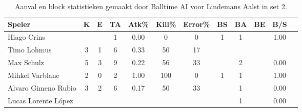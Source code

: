 \begin{table}[ht!]
  \centering
  \scriptsize
  \begin{tabular}{|l|c|c|c|c|c|c|c|c|c|c|c|} \hline
    \textbf{Speler} & K & E & TA & Atk\% & Kill\%  & Error\% & BS & BA & BE & B/S \\ \hline
    Hiago Crins & & & 1 & 0.00 & 0  & 0 & 1 & 1 & & 1.00 \\
    Timo Lohmus & 3 & 1 & 6 & 0.33 & 50  & 17 &  &  & & \\
    Max Schulz & 5 & 3 & 9 & 0.22 & 56  & 33 &  & 2 & & 0.00 \\
    Mihkel Varblane & 2 & 0 & 2 & 1.00 & 100  & 0 & 1 & 1 & & 1.00 \\
    Alvaro Gimeno Rubio & 3 & 2 & 6 & 0.17 & 50  & 33 &  & 1 & & 0.00\\
    Lucas Lorente López &  &  &  &  &  &  &  & 1 & & 0.00 \\ \hline
  \end{tabular}
  \caption[Aanval en block statistieken gemaakt door Balltime AI voor Lindemans Aalst in set 2]{\label{tab:PL1AttBlockAalstAI2}Aanval en block statistieken gemaakt door Balltime AI voor Lindemans Aalst in set 2.}
\end{table}
